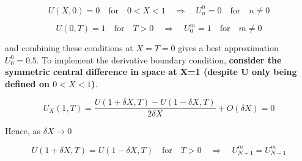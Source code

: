 \documentclass[10pt,a4paper]{report}
\begin{document}
\begin{equation*}
U(X,0) = 0 \quad \text{for} \quad 0<X<1 \quad  \Rightarrow \quad  U_n^0 = 0 \quad \text{for} \quad n \neq 0
\end{equation*}

\begin{equation*}
U(0,T) = 1 \quad \text{for} \quad T> 0 \quad  \Rightarrow \quad  U_0^m = 1 \quad \text{for} \quad m \neq 0
\end{equation*}

and combining these conditions at $X=T=0$ gives a best approximation $U_0^0=0.5$. To implement the derivative boundary condition, \textbf{consider the symmetric central difference in space at X=1 (despite U only being defined on $0<X<1$)}. 

\begin{equation*}
U_X(1,T) = \frac{U(1+\delta X,T) - U(1-\delta X,T)}{2\delta X} + O(\delta X) = 0
\end{equation*}

Hence, as $\delta X \to 0$

\begin{equation*}
U(1+\delta X,T) = U(1-\delta X,T) \quad \text{for} \quad T>0 \quad \Rightarrow \quad U_{N+1}^m=U_{N-1}^m
\end{equation*}

\vspace{2cm}
\end{document}
